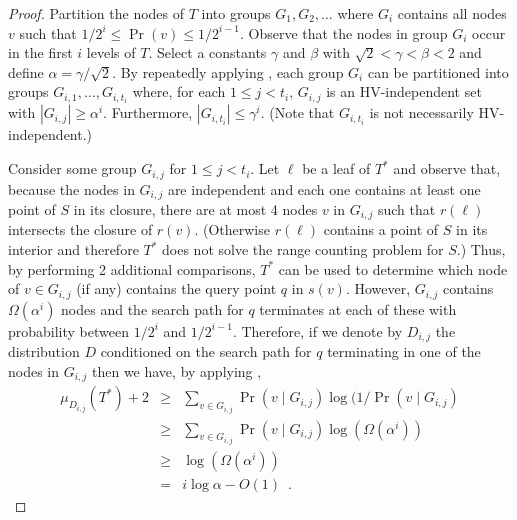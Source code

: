 \documentclass[charterfonts]{patmorin}
\begin{document}
\begin{proof}
Partition the nodes of $T$ into groups $G_1,G_2,\ldots$ where $G_i$
contains all nodes $v$ such that $1/2^{i} \le \Pr(v) \le 1/2^{i-1}$.
Observe that the nodes in group $G_i$ occur in the first $i$ levels of
$T$.  Select a constants $\gamma$ and $\beta$ with $\sqrt{2} < \gamma
< \beta < 2$ and define $\alpha=\gamma/\sqrt{2}$.  By
repeatedly applying , each group $G_i$ can be
partitioned into groups $G_{i,1},\ldots,G_{i,t_i}$ where, for each $1
\le j < t_i$, $G_{i,j}$ is an HV-independent set with $|G_{i,j}|
\ge \alpha^i$.  Furthermore, $|G_{i,t_i}| \le \gamma^i$. (Note that
$G_{i,t_i}$ is not necessarily HV-independent.)

Consider some group $G_{i,j}$ for $1\le j < t_i$.  Let $\ell$ be a
leaf of $T^*$ and observe that, because the nodes in $G_{i,j}$ are
independent and each one contains at least one point of $S$ in its
closure, there are at most 4 nodes $v$ in $G_{i,j}$ such that
$r(\ell)$ intersects the closure of $r(v)$.  (Otherwise $r(\ell)$
contains a point of $S$ in its interior and therefore $T^*$ does not
solve the range counting problem for $S$.) Thus, by performing 2 
additional comparisons, $T^*$ can be used to determine which node of
$v\in G_{i,j}$ (if any) contains the query point $q$ in $s(v)$.
However, $G_{i,j}$ contains $\Omega(\alpha^i)$ nodes and the search
path for $q$ terminates at each of these with probability between
$1/2^i$ and $1/2^{i-1}$.  Therefore, if we denote by $D_{i,j}$ the
distribution $D$ conditioned on the search path for $q$ terminating in
one of the nodes in $G_{i,j}$ then we have, by applying
,
\begin{eqnarray*}
   \mu_{D_{i,j}}(T^*) + 2 
    & \ge & \sum_{v\in G_{i,j}}\Pr(v\mid G_{i,j})\log(1/\Pr(v\mid G_{i,j}) \\
    & \ge & \sum_{v\in G_{i,j}}\Pr(v\mid G_{i,j})\log(\Omega(\alpha^i)) \\
    & \ge & \log(\Omega(\alpha^i)) \\
    & = & i\log\alpha - O(1) \enspace .
\end{eqnarray*}


\end{proof}
\end{document}
